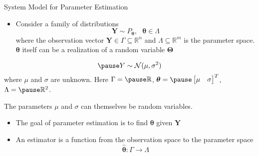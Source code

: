 \documentclass[t]{beamer}
\begin{document}
\begin{frame}{System Model for Parameter Estimation}
  \footnotesize
  \begin{itemize}
    \item \pause Consider a family of distributions
      \begin{equation*}
        \mathbf{Y} \sim P_{\boldsymbol{\theta}}, \ \ \ \boldsymbol{\theta} \in \Lambda
      \end{equation*}
    where the observation vector $\mathbf{Y} \in \Gamma \subseteq \mathbb{R}^n$ and $\Lambda \subseteq \mathbb{R}^m$ is the parameter space. \pause $\boldsymbol{\theta}$ itself can be a realization of a random variable $\boldsymbol{\Theta}$
  \end{itemize}
  \pause
  \begin{example}[]
      \begin{equation*}
        \pause Y \sim \mathcal{N}(\mu, \sigma^2)
      \end{equation*}
    where $\mu$ and $\sigma$ are unknown. \pause Here $\Gamma = \pause \mathbb{R}$, \pause $\boldsymbol{\theta} = \pause \begin{bmatrix} \mu & \sigma \end{bmatrix}^T$, \pause $\Lambda = \pause \mathbb{R}^2$.

      The parameters $\mu$ and $\sigma$ can themselves be random variables.
  \end{example}
  \begin{itemize}
    \item \pause The goal of parameter estimation is to find $\boldsymbol{\theta}$ given $\mathbf{Y}$
    \item \pause An estimator is a function from the observation space to the parameter space
      \begin{equation*}
        \hat{\boldsymbol{\theta}} : \Gamma \rightarrow \Lambda
      \end{equation*}
  \end{itemize} 
  \normalsize
\end{frame}
\end{document}
